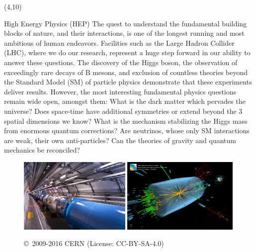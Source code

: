 \documentclass[final]{beamer}
\begin{document}
\begin{frame}{}
\begin{textblock}{38.0}(4,10)
\begin{block}{High Energy Physics (HEP)}
The quest to understand the fundamental building blocks of nature,
and their interactions, is one of the longest running and most
ambitious of human endeavors. Facilities such as the Large Hadron
Collider (LHC), where we do our research, represent a huge step
forward in our ability to answer these questions. The discovery of
the Higgs boson, the observation of exceedingly rare decays of B
mesons, and exclusion of countless theories beyond the Standard
Model (SM) of particle physics demonstrate that these experiments
deliver results. However, the most interesting fundamental physics
questions remain wide open, amongst them: What is the dark matter
which pervades the universe? Does space-time have additional
symmetries or extend beyond the 3 spatial dimensions we know? What
is the mechanism stabilizing the Higgs mass from enormous quantum
corrections? Are neutrinos, whose only SM interactions are weak,
their own anti-particles? Can the theories of gravity and quantum
mechanics be reconciled?
~~~ \\
\begin{figure}[tbph]
\centering
\includegraphics[width=0.48\textwidth]{images/0910152_02-A5-at-72-dpi.jpg}
\includegraphics[width=0.50\textwidth]{images/eemm_run195099_evt137440354_ispy_3d-annotated-2.png}
\begin{center}
{\small \copyright~2009-2016 CERN (License: CC-BY-SA-4.0)}
\end{center}
\end{figure}
\end{block}
\end{textblock}




\end{frame}
\end{document}
